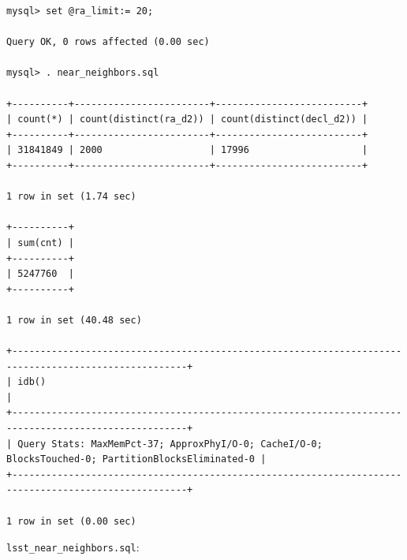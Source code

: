 \documentclass[DM,lsstdraft,toc]{lsstdoc}
\begin{document}
\begin{verbatim}
mysql> set @ra_limit:= 20;

Query OK, 0 rows affected (0.00 sec)

mysql> . near_neighbors.sql

+----------+------------------------+--------------------------+
| count(*) | count(distinct(ra_d2)) | count(distinct(decl_d2)) |
+----------+------------------------+--------------------------+
| 31841849 | 2000                   | 17996                    |
+----------+------------------------+--------------------------+

1 row in set (1.74 sec)

+----------+
| sum(cnt) |
+----------+
| 5247760  |
+----------+

1 row in set (40.48 sec)

+-----------------------------------------------------------------------------------------------------+
| idb()                                                                                               |
+-----------------------------------------------------------------------------------------------------+
| Query Stats: MaxMemPct-37; ApproxPhyI/O-0; CacheI/O-0; BlocksTouched-0; PartitionBlocksEliminated-0 |
+-----------------------------------------------------------------------------------------------------+

1 row in set (0.00 sec)
\end{verbatim}

\texttt{lsst\_near\_neighbors.sql}:
\end{document}
